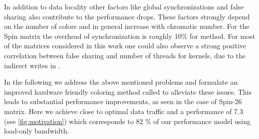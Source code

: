   In addition to data locality other factors like global synchronizations and false sharing also contribute to the performance drops. These factors strongly depend on the number of colors and in general increase with chromatic number. For the Spin matrix the overhead of synchronization is roughly 10\% for \MC method.  For most of the matrices considered in this work one could also observe a strong positive correlation between false sharing and number of threads for \SymmSpmv kernels, due to the indirect writes in \SymmSpmv.
 
 



In the following we address the above mentioned problems and formulate an improved hardware friendly coloring method called \RACE to alleviate these issues. This leads to substantial performance improvements, as seen in the case of Spin-26 matrix. Here we achieve close to optimal data traffic and a performance of 7.3 \GF(see \cref{fig:motivation}) which corresponds to 82 \% of our performance model using load-only bandwidth.

 

